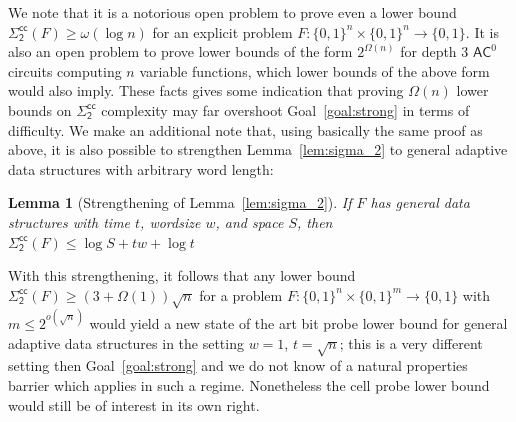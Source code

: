 \documentclass[11pt]{article}
\newtheorem{lemma}{Lemma}
\newcommand{\B}{\{0,1\}}
\begin{document}
We note that it is a notorious open problem to prove even a lower bound $\mathsf{\Sigma_2^{cc}}(F) \geq \omega(\log n)$ for an explicit problem $F: \B^n \times \B^n \to \B$. It is also an open problem to prove lower bounds of the form $2^{\Omega(n)}$ for depth 3 $\mathsf{AC}^0$ circuits computing $n$ variable functions, which lower bounds of the above form would also imply. 
These facts gives some indication that proving $\Omega(n)$ lower bounds on $\mathsf{\Sigma_2^{cc}}$ complexity may far overshoot Goal~\ref{goal:strong} in terms of difficulty. 
We make an additional note that, using basically the same proof as above, it is also possible to strengthen Lemma~\ref{lem:sigma_2} to general adaptive data structures with arbitrary word length:
\begin{lemma}[Strengthening of Lemma~\ref{lem:sigma_2}]
If $F$ has general data structures with time $t$, wordsize $w$, and space $S$, then 
$\mathsf{\Sigma_2^{cc}}(F) \leq \log S + tw + \log t$  
\end{lemma}

With this strengthening, it follows that any lower bound $\mathsf{\Sigma_2^{cc}}(F) \geq (3+\Omega(1)) \sqrt{n}$ for a problem $F: \B^n \times \B^m \to \B$ with $m\leq 2^{o(\sqrt{n})}$ would yield a new state of the art bit probe lower bound for general adaptive data structures in the setting $w=1$, $t = \sqrt{n}$; this is a very different setting then Goal~\ref{goal:strong} and we do not know of a natural properties barrier which applies in such a regime. Nonetheless the cell probe lower bound would still be of interest in its own right.
\end{document}
